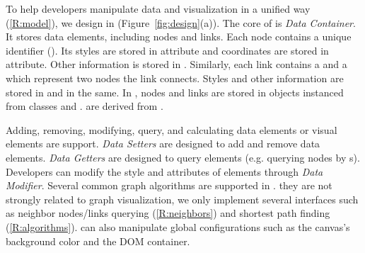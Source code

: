 To help developers manipulate data and visualization in a unified way (\ref{R:model}), we design  \GraModMan in \name (Figure~\ref{fig:design}(a)).
The core of  \GraModMan is  \textit{Data Container}. It stores data elements, including nodes and links.
Each node contains a unique identifier ().
Its styles are stored in   attribute and coordinates are stored in   attribute.
Other information is stored in .
Similarly, each link contains a  and a \added[id=kg]{,} which represent two nodes the link connects.
Styles and other information are stored in  and  in the same.
In \name, nodes and links are stored in objects instanced from classes  and .  are derived from .


Adding, removing, modifying, query, and calculating data elements or visual elements are support.
\textit{Data Setters} are designed to add and remove data elements.
\textit{Data Getters} are designed to query elements (e.g.\added[id=kg]{,} querying nodes by s).
Developers can modify the style and attributes of elements through  \textit{Data Modifier}.
Several common graph algorithms are supported in \name.  they are not strongly related to graph visualization, we only implement several interfaces\added[id=kg]{,} such as neighbor nodes/links querying (\ref{R:neighbors}) and shortest path finding (\ref{R:algorithms}).
 \GraModMan can also manipulate global configurations such as the canvas's background color and the DOM container.

\subsubsection{\RenEng}

